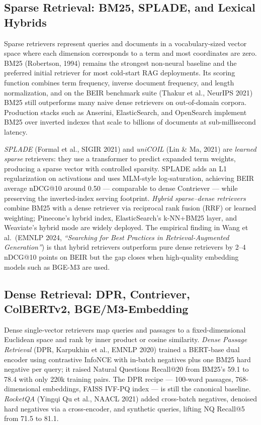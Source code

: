 \subsection{Sparse Retrieval: BM25, SPLADE, and Lexical Hybrids}\label{sparse-retrieval-bm25-splade-and-lexical-hybrids}

Sparse retrievers represent queries and documents in a vocabulary-sized vector space where each dimension corresponds to a term and most coordinates are zero. BM25 (Robertson, 1994) remains the strongest non-neural baseline and the preferred initial retriever for most cold-start RAG deployments. Its scoring function combines term frequency, inverse document frequency, and length normalization, and on the BEIR benchmark suite (Thakur et al., NeurIPS 2021) BM25 still outperforms many naive dense retrievers on out-of-domain corpora. Production stacks such as Anserini, ElasticSearch, and OpenSearch implement BM25 over inverted indexes that scale to billions of documents at sub-millisecond latency.

\emph{SPLADE} (Formal et al., SIGIR 2021) and \emph{uniCOIL} (Lin \& Ma, 2021) are \emph{learned sparse} retrievers: they use a transformer to predict expanded term weights, producing a sparse vector with controlled sparsity. SPLADE adds an L1 regularization on activations and uses MLM-style log-saturation, achieving BEIR average nDCG@10 around 0.50 --- comparable to dense Contriever --- while preserving the inverted-index serving footprint. \emph{Hybrid sparse--dense retrievers} combine BM25 with a dense retriever via reciprocal rank fusion (RRF) or learned weighting; Pinecone's hybrid index, ElasticSearch's k-NN+BM25 layer, and Weaviate's hybrid mode are widely deployed. The empirical finding in Wang et al.~(EMNLP 2024, \emph{``Searching for Best Practices in Retrieval-Augmented Generation''}) is that hybrid retrievers outperform pure dense retrievers by 2--4 nDCG@10 points on BEIR but the gap closes when high-quality embedding models such as BGE-M3 are used.

\subsection{Dense Retrieval: DPR, Contriever, ColBERTv2, BGE/M3-Embedding}\label{dense-retrieval-dpr-contriever-colbertv2-bgem3-embedding}

Dense single-vector retrievers map queries and passages to a fixed-dimensional Euclidean space and rank by inner product or cosine similarity. \emph{Dense Passage Retrieval} (DPR, Karpukhin et al., EMNLP 2020) trained a BERT-base dual encoder using contrastive InfoNCE with in-batch negatives plus one BM25 hard negative per query; it raised Natural Questions Recall@20 from BM25's 59.1 to 78.4 with only 220k training pairs. The DPR recipe --- 100-word passages, 768-dimensional embeddings, FAISS IVF-PQ index --- is still the canonical baseline. \emph{RocketQA} (Yingqi Qu et al., NAACL 2021) added cross-batch negatives, denoised hard negatives via a cross-encoder, and synthetic queries, lifting NQ Recall@5 from 71.5 to 81.1.

